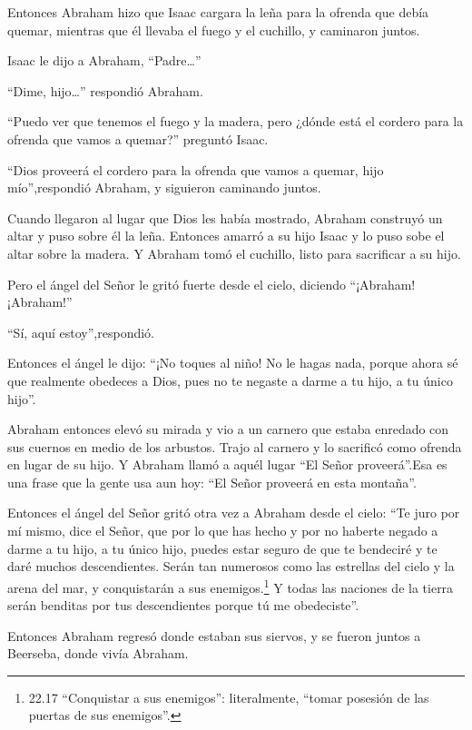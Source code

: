  Entonces Abraham hizo que Isaac cargara la leña para la
ofrenda que debía quemar, mientras que él llevaba el fuego y el
cuchillo, y caminaron juntos.

 Isaac le dijo a Abraham, ``Padre\ldots{}''

``Dime, hijo\ldots{}'' respondió Abraham.

``Puedo ver que tenemos el fuego y la madera, pero ¿dónde está el
cordero para la ofrenda que vamos a quemar?'' preguntó Isaac.

 ``Dios proveerá el cordero para la ofrenda que vamos a
quemar, hijo mío'',respondió Abraham, y siguieron caminando juntos.

 Cuando llegaron al lugar que Dios les había mostrado,
Abraham construyó un altar y puso sobre él la leña. Entonces amarró a su
hijo Isaac y lo puso sobe el altar sobre la madera.  Y
Abraham tomó el cuchillo, listo para sacrificar a su hijo.

 Pero el ángel del Señor le gritó fuerte desde el cielo,
diciendo ``¡Abraham! ¡Abraham!''

``Sí, aquí estoy'',respondió.

 Entonces el ángel le dijo: ``¡No toques al niño! No le
hagas nada, porque ahora sé que realmente obedeces a Dios, pues no te
negaste a darme a tu hijo, a tu único hijo''.

 Abraham entonces elevó su mirada y vio a un carnero que
estaba enredado con sus cuernos en medio de los arbustos. Trajo al
carnero y lo sacrificó como ofrenda en lugar de su hijo.  Y
Abraham llamó a aquél lugar ``El Señor proveerá''.Esa es una frase que
la gente usa aun hoy: ``El Señor proveerá en esta montaña''.

 Entonces el ángel del Señor gritó otra vez a Abraham desde
el cielo:  ``Te juro por mí mismo, dice el Señor, que por
lo que has hecho y por no haberte negado a darme a tu hijo, a tu único
hijo,  puedes estar seguro de que te bendeciré y te daré
muchos descendientes. Serán tan numerosos como las estrellas del cielo y
la arena del mar, y conquistarán a sus enemigos.\footnote{22.17
  ``Conquistar a sus enemigos'': literalmente, ``tomar posesión de las
  puertas de sus enemigos''.}  Y todas las naciones de la
tierra serán benditas por tus descendientes porque tú me obedeciste''.

 Entonces Abraham regresó donde estaban sus siervos, y se
fueron juntos a Beerseba, donde vivía Abraham.

